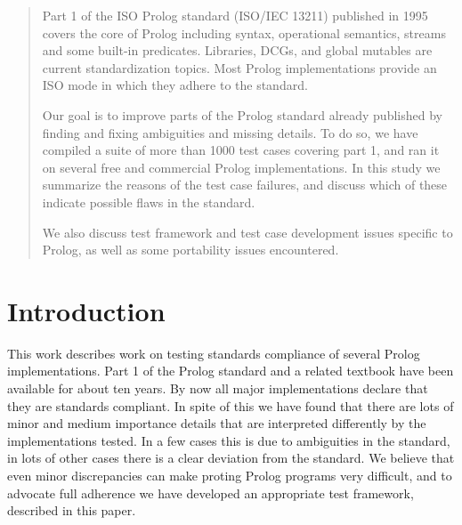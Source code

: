 \documentclass[draft]{llncs}%
\begin{document}
\begin{abstract}

\ifdim\parindent=0pt \parindent1em \fi



Part 1 of the ISO Prolog standard (ISO/IEC 13211) published in 1995 covers
the  core of Prolog including syntax, operational semantics,
streams and some built-in predicates. Libraries, DCGs, and global
mutables are current standardization topics. Most Prolog implementations
provide an ISO mode in which they adhere to the standard.

Our goal is to improve parts of the Prolog standard already published by
finding and fixing ambiguities and missing details. To do so, we have
compiled a suite of more than 1000 test cases covering part 1, and ran it
on several free and commercial Prolog implementations. In this study we
summarize the reasons of the test case failures, and discuss which of these
indicate possible flaws in the standard.

We also discuss test framework and test case development issues specific to
Prolog, as well as some portability issues encountered.

\end{abstract}

\section{Introduction}


This work describes work on testing standards compliance of several Prolog
implementations. Part 1 of the Prolog standard \cite{isoprolog95} and a
related textbook \cite{isoprologbook} have been available for about ten
years. By now all major implementations declare that they are standards
compliant. In spite of this we have found that there are lots of minor and
medium importance details that are interpreted differently by the
implementations tested. In a few cases this is due to ambiguities in the
standard, in lots of other cases there is a clear deviation from the
standard. We believe that even minor discrepancies can make proting Prolog
programs very difficult, and to advocate full adherence we have developed an
appropriate test framework, described in this paper.
\end{document}

